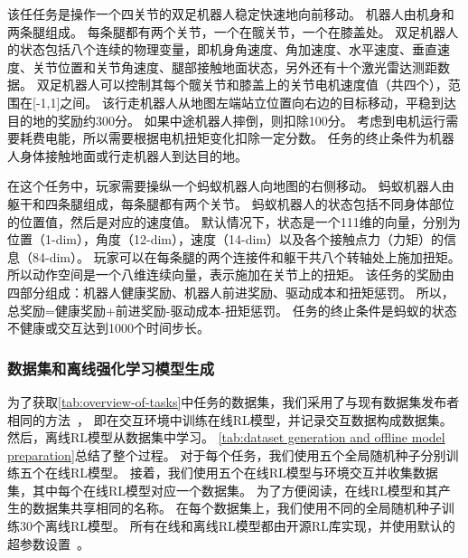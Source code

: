 该任任务是操作一个四关节的双足机器人稳定快速地向前移动。
机器人由机身和两条腿组成。
每条腿都有两个关节，一个在髋关节，一个在膝盖处。
双足机器人的状态包括八个连续的物理变量，即机身角速度、角加速度、水平速度、垂直速度、关节位置和关节角速度、腿部接触地面状态，另外还有十个激光雷达测距数据。
双足机器人可以控制其每个髋关节和膝盖上的关节电机速度值（共四个），范围在[-1,1]之间。
该行走机器人从地图左端站立位置向右边的目标移动，平稳到达目的地的奖励约300分。
如果中途机器人摔倒，则扣除100分。
考虑到电机运行需要耗费电能，所以需要根据电机扭矩变化扣除一定分数。
任务的终止条件为机器人身体接触地面或行走机器人到达目的地。

在这个任务中，玩家需要操纵一个蚂蚁机器人向地图的右侧移动。
蚂蚁机器人由躯干和四条腿组成，每条腿都有两个关节。 
蚂蚁机器人的状态包括不同身体部位的位置值，然后是对应的速度值。 
默认情况下，状态是一个111维的向量，分别为位置（1-dim），角度（12-dim），速度（14-dim）以及各个接触点力（力矩）的信息（84-dim）。 
玩家可以在每条腿的两个连接件和躯干共八个转轴处上施加扭矩。
所以动作空间是一个八维连续向量，表示施加在关节上的扭矩。 
该任务的奖励由四部分组成：机器人健康奖励、机器人前进奖励、驱动成本和扭矩惩罚。 
所以，总奖励=健康奖励+前进奖励-驱动成本-扭矩惩罚。 
任务的终止条件是蚂蚁的状态不健康或交互达到1000个时间步长。

\subsubsection{数据集和离线强化学习模型生成}
为了获取\autoref{tab:overview-of-tasks}中任务的数据集，我们采用了与现有数据集发布者相同的方法~\cite{DBLP:journals/corr/abs-2006-13888, DBLP:journals/corr/abs-2004-07219, DBLP:journals/corr/abs-2102-00714, tensorflow2015-whitepaper}，
即在交互环境中训练在线RL模型，并记录交互数据构成数据集。
然后，离线RL模型从数据集中学习。 
\autoref{tab:dataset generation and offline model preparation}总结了整个过程。 
对于每个任务，我们使用五个全局随机种子分别训练五个在线RL模型。 
接着，我们使用五个在线RL模型与环境交互并收集数据集，其中每个在线RL模型对应一个数据集。 
为了方便阅读，在线RL模型和其产生的数据集共享相同的名称。 
在每个数据集上，我们使用不同的全局随机种子训练30个离线RL模型。 
所有在线和离线RL模型都由开源RL库实现，并使用默认的超参数设置~\cite{stable-baselines3, d3rlpy}。

